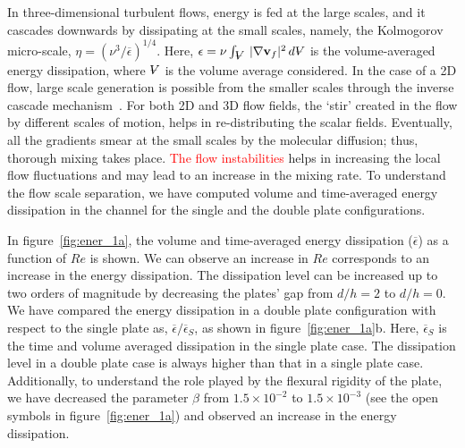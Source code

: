 \documentclass[aps,pre,twocolumn,aps,longbibliography]{revtex4-1}
\newcommand{\volume}{{\ooalign{\hfil$V$\hfil\cr\kern0.08em--\hfil\cr}}}
\begin{document}
	
	In three-dimensional turbulent flows, energy is fed at the large scales, and it cascades downwards by dissipating at the small scales, namely, the Kolmogorov micro-scale, $\eta=(\nu^3/\overline{\epsilon})^{1/4}$. Here, $\epsilon= {\nu}\int_{\volume}\, |\nabla\mathbf{v}_f|^2\, d\volume$ is the volume-averaged energy dissipation, where $\volume$ is the volume average considered. In the case of a 2D flow, large scale generation is possible from the smaller scales through the inverse cascade mechanism~\citep{Boffetta2012, Mishra2015}. For both 2D and 3D flow fields, the `stir' created in the flow by different scales of motion, helps in re-distributing the scalar fields. Eventually, all the gradients smear at the small scales by the molecular diffusion; thus, thorough mixing takes place. \textcolor{red}{The flow instabilities} helps in increasing the local flow fluctuations and may lead to an increase in the mixing rate. To understand the flow scale separation, we have computed volume and time-averaged energy dissipation in the channel for the single and the double plate configurations. 
	
	
	
	In figure~\ref{fig:ener_1a}, the volume and time-averaged energy dissipation ($\overline{\epsilon}$) as a function of $Re$ is shown. We can observe an increase in $Re$ corresponds to an increase in the energy dissipation. The dissipation level can be increased up to two orders of magnitude by decreasing the plates' gap from $d/h=2$ to $d/h=0$. We have compared the energy dissipation in a double plate configuration with respect to the single plate as, ${\overline{\epsilon}/\overline{\epsilon}_S}$, as shown in figure~\ref{fig:ener_1a}b. Here, $\overline{\epsilon}_S$ is the time and volume averaged dissipation in the single plate case. The dissipation level in a double plate case is always higher than that in a single plate case. Additionally, to understand the role played by the flexural rigidity of the plate, we have decreased the parameter $\beta$ from $1.5 \times 10^{-2}$ to $1.5\times 10^{-3}$ (see the open symbols in figure~\ref{fig:ener_1a}) and observed an increase in the energy dissipation.
	
	
	
\end{document}
